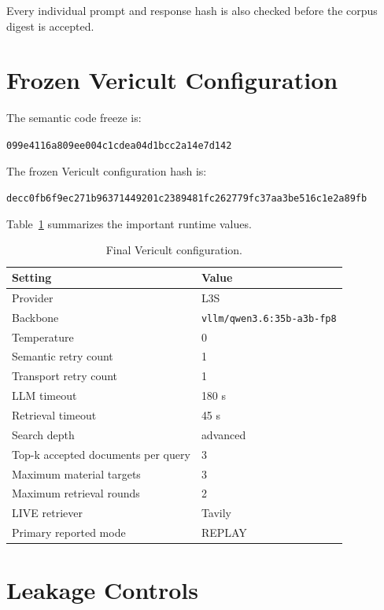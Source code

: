 Every individual prompt and response hash is also checked before the corpus digest is accepted.

\section{Frozen Vericult Configuration}

The semantic code freeze is:

\begin{center}
\texttt{099e4116a809ee004c1cdea04d1bcc2a14e7d142}
\end{center}

The frozen Vericult configuration hash is:

\begin{center}
\texttt{decc0fb6f9ec271b96371449201c2389481fc262779fc37aa3be516c1e2a89fb}
\end{center}

Table~\ref{tab:verifier-config} summarizes the important runtime values.

\begin{table}[ht]
\centering
\caption{Final Vericult configuration.}
\label{tab:verifier-config}
\begin{tabular}{l l}
\toprule
Setting & Value \\
\midrule
Provider & L3S \\
Backbone & \texttt{vllm/qwen3.6:35b-a3b-fp8} \\
Temperature & 0 \\
Semantic retry count & 1 \\
Transport retry count & 1 \\
LLM timeout & 180 s \\
Retrieval timeout & 45 s \\
Search depth & advanced \\
Top-k accepted documents per query & 3 \\
Maximum material targets & 3 \\
Maximum retrieval rounds & 2 \\
LIVE retriever & Tavily \\
Primary reported mode & REPLAY \\
\bottomrule
\end{tabular}
\end{table}

\section{Leakage Controls}

